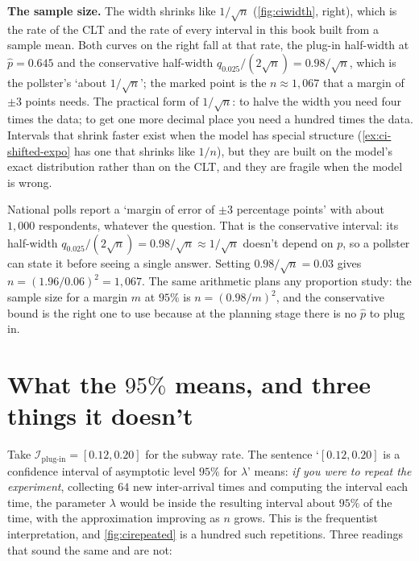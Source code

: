 \textbf{The sample size.}
The width shrinks like $1/\sqrt{n}$ (\cref{fig:ciwidth}, right), which is the rate of the CLT and the rate of every interval in this book built from a sample mean.
Both curves on the right fall at that rate, the plug-in half-width at $\hat{p} = 0.645$ and the conservative half-width $q_{0.025}/(2\sqrt{n}) = 0.98/\sqrt{n}$, which is the pollster's `about $1/\sqrt{n}$'; the marked point is the $n \approx 1{,}067$ that a margin of $\pm 3$ points needs.
The practical form of $1/\sqrt{n}$: to halve the width you need four times the data; to get one more decimal place you need a hundred times the data.
Intervals that shrink faster exist when the model has special structure (\cref{ex:ci-shifted-expo} has one that shrinks like $1/n$), but they are built on the model's exact distribution rather than on the CLT, and they are fragile when the model is wrong.

\begin{bridge}
National polls report a `margin of error of $\pm 3$ percentage points' with about $1{,}000$ respondents, whatever the question.
That is the conservative interval: its half-width $q_{0.025}/(2\sqrt{n}) = 0.98/\sqrt{n} \approx 1/\sqrt{n}$ doesn't depend on $p$, so a pollster can state it before seeing a single answer.
Setting $0.98/\sqrt{n} = 0.03$ gives $n = (1.96/0.06)^2 = 1{,}067$.
The same arithmetic plans any proportion study: the sample size for a margin $m$ at $95\%$ is $n = (0.98/m)^2$, and the conservative bound is the right one to use because at the planning stage there is no $\hat{p}$ to plug in.
\end{bridge}

\section{What the \texorpdfstring{$95\%$}{95\%} means, and three things it doesn't}
\label{sec:ci-meaning}

Take $\mathcal{I}_{\text{plug-in}} = [0.12, 0.20]$ for the subway rate.
The sentence `$[0.12, 0.20]$ is a confidence interval of asymptotic level $95\%$ for $\lambda$' means: \textit{if you were to repeat the experiment}, collecting $64$ new inter-arrival times and computing the interval each time, the parameter $\lambda$ would be inside the resulting interval about $95\%$ of the time, with the approximation improving as $n$ grows.
This is the frequentist interpretation, and \cref{fig:cirepeated} is a hundred such repetitions.
Three readings that sound the same and are not:

